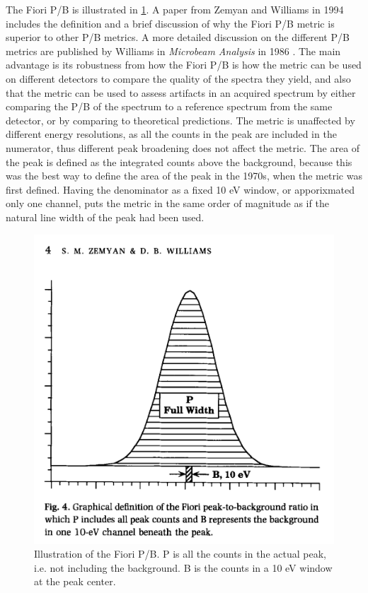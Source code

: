 The Fiori P/B is illustrated in \cref{fig:fiori_pb}.
A paper from Zemyan and Williams in 1994 \cite{zemyan_standard_performance_1994} includes the definition and a brief discussion of why the Fiori P/B metric is superior to other P/B metrics.
A more detailed discussion on the different P/B metrics are published by Williams in \emph{Microbeam Analysis} in 1986 \cite{williams_standard_definitions_1986}.
The main advantage is its robustness from how the Fiori P/B is how the metric can be used on different detectors to compare the quality of the spectra they yield, and also that the metric can be used to assess artifacts in an acquired spectrum by either comparing the P/B of the spectrum to a reference spectrum from the same detector, or by comparing to theoretical predictions. %
The metric is unaffected by different energy resolutions, as all the counts in the peak are included in the numerator, thus different peak broadening does not affect the metric.
The area of the peak is defined as the integrated counts above the background, because this was the best way to define the area of the peak in the 1970s, when the metric was first defined.
Having the denominator as a fixed 10 eV window, or apporixmated only one channel, puts the metric in the same order of magnitude as if the natural line width of the peak had been used.




\begin{figure}
    \centering
    \includegraphics[width=0.6\linewidth]{figures/FioriPB_TODO_remake.png}
    \caption{Illustration of the Fiori P/B.
        P is all the counts in the actual peak, i.e. not including the background.
        B is the counts in a 10 eV window at the peak center.
        }
    \label{fig:fiori_pb}
\end{figure}

